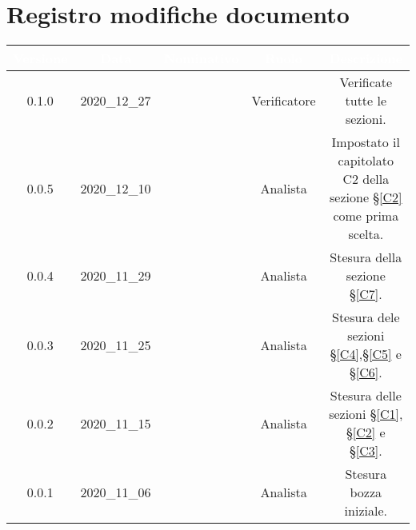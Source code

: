 \section*{Registro modifiche documento}
{
\renewcommand{\arraystretch}{1.5}
\centering
\begin{longtable}{c c C{2.3cm} c c}


 \textcolor{white}{\textbf{Versione}} &
    \textcolor{white}{\textbf{Data}} &
    \textcolor{white}{\textbf{Nominativo}} &
    \textcolor{white}{\textbf{Ruolo}} &
    \textcolor{white}{\textbf{Descrizione}}\\	
    \endhead
    
    
     0.1.0 & 2020\_12\_27 & \TG{} & Verificatore & Verificate tutte le sezioni. \\
    
    0.0.5 & 2020\_12\_10 & \FF{} & Analista & Impostato il capitolato C2 della sezione \S\ref{C2} come prima scelta.  \\

    0.0.4 & 2020\_11\_29 & \FF{} & Analista & Stesura della sezione \S\ref{C7}.  \\
    
    0.0.3 & 2020\_11\_25 & \FF{} & Analista & Stesura dele sezioni \S\ref{C4},\S \ref{C5} e \S\ref{C6}.  \\
    
    0.0.2 & 2020\_11\_15 & \FF{} & Analista & Stesura delle sezioni \S\ref{C1}, \S\ref{C2} e \S\ref{C3}.  \\
            
    0.0.1 & 2020\_11\_06 & \FF{} & Analista & Stesura bozza iniziale.  \\
			
\end{longtable}
}